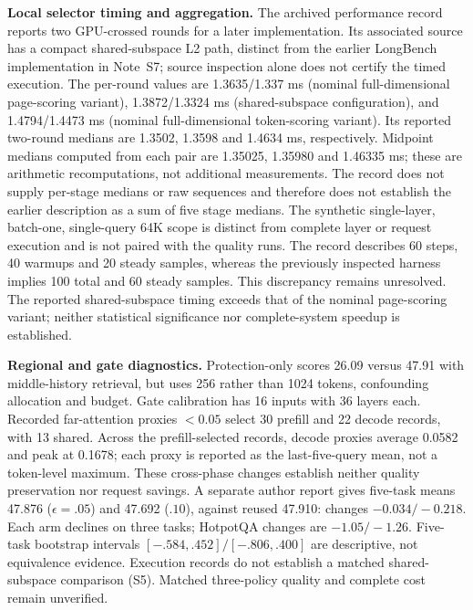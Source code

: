 \documentclass[10pt,letterpaper]{article}
\begin{document}
\textbf{Local selector timing and aggregation.} The archived performance record reports two GPU-crossed rounds for a later implementation. Its associated source has a compact shared-subspace L2 path, distinct from the earlier LongBench implementation in Note~S7; source inspection alone does not certify the timed execution. The per-round values are 1.3635/1.337 ms (nominal full-dimensional page-scoring variant), 1.3872/1.3324 ms (shared-subspace configuration), and 1.4794/1.4473 ms (nominal full-dimensional token-scoring variant). Its reported two-round medians are 1.3502, 1.3598 and 1.4634 ms, respectively. Midpoint medians computed from each pair are 1.35025, 1.35980 and 1.46335 ms; these are arithmetic recomputations, not additional measurements. The record does not supply per-stage medians or raw sequences and therefore does not establish the earlier description as a sum of five stage medians. The synthetic single-layer, batch-one, single-query 64K scope is distinct from complete layer or request execution and is not paired with the quality runs. The record describes 60 steps, 40 warmups and 20 steady samples, whereas the previously inspected harness implies 100 total and 60 steady samples. This discrepancy remains unresolved. The reported shared-subspace timing exceeds that of the nominal page-scoring variant; neither statistical significance nor complete-system speedup is established.

\textbf{Regional and gate diagnostics.} Protection-only scores 26.09 versus 47.91 with middle-history retrieval, but uses 256 rather than 1024 tokens, confounding allocation and budget. Gate calibration has 16 inputs with 36 layers each. Recorded far-attention proxies $<0.05$ select 30 prefill and 22 decode records, with 13 shared. Across the prefill-selected records, decode proxies average 0.0582 and peak at 0.1678; each proxy is reported as the last-five-query mean, not a token-level maximum. These cross-phase changes establish neither quality preservation nor request savings. A separate author report gives five-task means 47.876 ($\epsilon=.05$) and 47.692 ($.10$), against reused 47.910: changes $-0.034/-0.218$. Each arm declines on three tasks; HotpotQA changes are $-1.05/-1.26$. Five-task bootstrap intervals $[-.584,.452]/[-.806,.400]$ are descriptive, not equivalence evidence. Execution records do not establish a matched shared-subspace comparison (S5). Matched three-policy quality and complete cost remain unverified.
\end{document}
